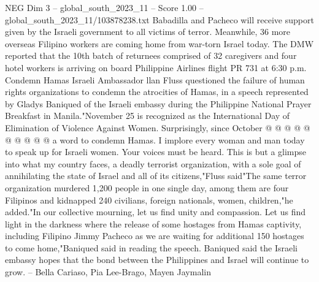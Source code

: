 \begin{textsample}{NEG Dim 3 – global\_south\_2023\_11 – Score 1.00 – global\_south\_2023\_11/103878238.txt}
Babadilla and Pacheco will receive support given by the Israeli government to all victims of terror.
Meanwhile, 36 more overseas Filipino workers are coming home from war-torn Israel today.
The DMW reported that the 10th batch of returnees comprised of 32 caregivers and four hotel workers is arriving on board Philippine Airlines flight PR 731 at 6:30 p.m.
Condemn Hamas Israeli Ambassador llan Fluss questioned the failure of human rights organizations to condemn the atrocities of Hamas, in a speech represented by Gladys Baniqued of the Israeli embassy during the Philippine National Prayer Breakfast in Manila."November 25 is recognized as the International Day of Elimination of Violence Against Women.
Surprisingly, since October @ @ @ @ @ @ @ @ @ @ a word to condemn Hamas.
I implore every woman and man today to speak up for Israeli women.
Your voices must be heard.
This is but a glimpse into what my country faces, a deadly terrorist organization, with a sole goal of annihilating the state of Israel and all of its citizens,"Fluss said"The same terror organization murdered 1,200 people in one single day, among them are four Filipinos and kidnapped 240 civilians, foreign nationals, women, children,"he added."In our collective mourning, let us find unity and compassion.
Let us find light in the darkness where the release of some hostages from Hamas captivity, including Filipino Jimmy Pacheco as we are waiting for additional 150 hostages to come home,"Baniqued said in reading the speech.
Baniqued said the Israeli embassy hopes that the bond between the Philippines and Israel will continue to grow. -- Bella Cariaso, Pia Lee-Brago, Mayen Jaymalin

\end{textsample}

